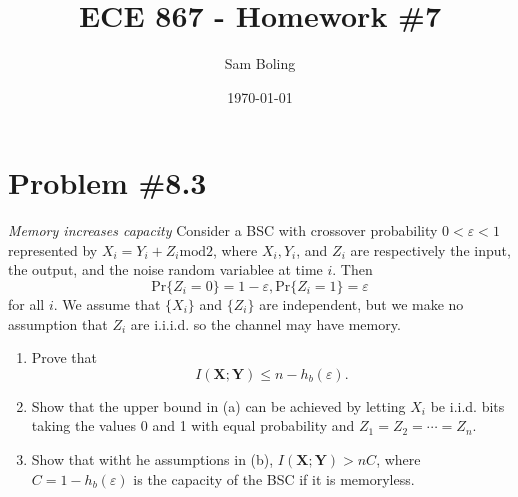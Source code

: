 \documentclass{article}
\title{ECE 867 - Homework \#7}
\author{Sam Boling}
\date{\today}
\begin{document}
\maketitle

\section*{Problem \#8.3}
\textit{Memory increases capacity} Consider a BSC with crossover probability
$0 < \varepsilon < 1$ represented by $X_i = Y_i + Z_i \mathrm{mod} 2$,
where $X_i, Y_i$, and $Z_i$ are respectively the input, the output, and the
noise random variablee at time $i$. Then
$$
\mathrm{Pr}\{Z_i = 0\} = 1 - \varepsilon,
\mathrm{Pr}\{Z_i = 1\} = \varepsilon
$$
for all $i$. We assume that $\{X_i\}$ and $\{Z_i\}$ are independent, but we
make no assumption that $Z_i$ are i.i.i.d. so the channel may have memory.
\begin{enumerate}
  \item{Prove that
        $$
        I(\mathbf{X} ; \mathbf{Y}) \leq n - h_b(\varepsilon).
        $$
       }
  \item{Show that the upper bound in (a) can be achieved by letting $X_i$ be
        i.i.d. bits taking the values 0 and 1 with equal probability and 
        $Z_1 = Z_2 = \cdots = Z_n$. 
       }
  \item{Show that witht he assumptions in (b), 
        $I(\mathbf{X} ; \mathbf{Y}) > nC$, where $C = 1 - h_b(\varepsilon)$
        is the capacity of the BSC if it is memoryless.
       }
\end{enumerate}
\end{document}
